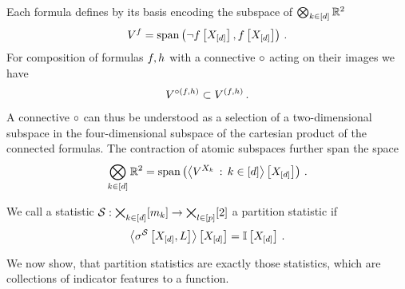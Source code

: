 
\begin{example}
    Each formula defines by its basis encoding the subspace of $\bigotimes_{k\in[d]}\mathbb{R}^2$
    \begin{align*}
        V^{f} = \mathrm{span}\left(\lnot f\left[X_{[d]}\right],f\left[X_{[d]}\right]\right) \, .
    \end{align*}
    For composition of formulas $f,h$ with a connective $\circ$ acting on their images we have %
    \begin{align*}
        V^{\circ(f,h)}
        \subset V^{(f,h)} \, .
    \end{align*}
    A connective $\circ$ can thus be understood as a selection of a two-dimensional subspace in the four-dimensional subspace of the cartesian product of the connected formulas.
    The contraction of atomic subspaces further span the space
    \begin{align*}
        \bigotimes_{k\in[d]}\mathbb{R}^2 = \mathrm{span}\left(\left\langle 
            V^{X_{k}} \, : \, k\in[d]
        \right\rangle \left[ X_{[d]} \right]\right) \, .
    \end{align*}
\end{example}



\begin{definition}
    \label{def:partitionStatistic}
    We call a statistic $\mathcal{S} : \bigtimes_{k\in[d]}[m_{k}] \rightarrow \bigtimes_{l\in[p]}[2]$ a partition statistic if
    \begin{align*}
        \left\langle \sigma^{\mathcal{S}}\left[X_{[d]},L\right]\right\rangle \left[ X_{[d]} \right] = \mathbb{I}\left[X_{[d]}\right] \, .
    \end{align*}
\end{definition}

We now show, that partition statistics are exactly those statistics, which are collections of indicator features to a function.

